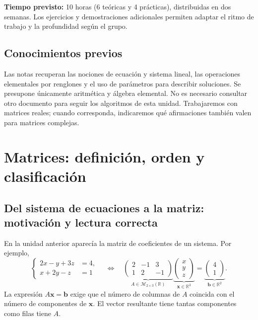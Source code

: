 \documentclass[12pt]{article}
\theoremstyle{remark}
\newcommand{\R}{\mathbb{R}}
\newcommand{\Mat}[2]{\mathcal{M}_{#1\times #2}}
\newcommand{\vect}[1]{\boldsymbol{#1}}
\begin{document}
\textbf{Tiempo previsto:} 10 horas (6 teóricas y 4 prácticas), distribuidas en dos semanas. Los ejercicios y demostraciones adicionales permiten adaptar el ritmo de trabajo y la profundidad según el grupo.

\subsection*{Conocimientos previos}
Las notas recuperan las nociones de ecuación y sistema lineal, las operaciones elementales por renglones y el uso de parámetros para describir soluciones. Se presupone únicamente aritmética y álgebra elemental. No es necesario consultar otro documento para seguir los algoritmos de esta unidad. Trabajaremos con matrices reales; cuando corresponda, indicaremos qué afirmaciones también valen para matrices complejas.

\section{Matrices: definición, orden y clasificación}
\subsection{Del sistema de ecuaciones a la matriz: motivación y lectura correcta}
En la unidad anterior aparecía la matriz de coeficientes de un sistema. Por ejemplo,
\[
\left\{\begin{aligned}2x-y+3z&=4,\\x+2y-z&=1\end{aligned}\right.
\quad\Longleftrightarrow\quad
\underbrace{\begin{pmatrix}2&-1&3\\1&2&-1\end{pmatrix}}_{A\in\Mat{2}{3}(\R)}
\underbrace{\begin{pmatrix}x\\y\\z\end{pmatrix}}_{\vect x\in\R^3}
=\underbrace{\begin{pmatrix}4\\1\end{pmatrix}}_{\vect b\in\R^2}.
\]
La expresión $A\vect x=\vect b$ exige que el número de columnas de $A$ coincida con el número de componentes de $\vect x$. El vector resultante tiene tantas componentes como filas tiene $A$.
\end{document}
